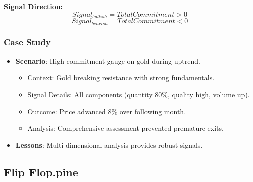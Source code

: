 \documentclass[12pt]{article}
\begin{document}
\textbf{Signal Direction:}
\[
Signal_{bullish} = TotalCommitment > 0
\]
\[
Signal_{bearish} = TotalCommitment < 0
\]

\subsubsection{Case Study}
\begin{itemize}
\item \textbf{Scenario}: High commitment gauge on gold during uptrend.
  \begin{itemize}
  \item Context: Gold breaking resistance with strong fundamentals.
  \item Signal Details: All components (quantity 80\%, quality high, volume up).
  \item Outcome: Price advanced 8\% over following month.
  \item Analysis: Comprehensive assessment prevented premature exits.
  \end{itemize}
\item \textbf{Lessons}: Multi-dimensional analysis provides robust signals.
\end{itemize}

\subsection{Flip Flop.pine}
\label{subsec:flipflop}
\end{document}
